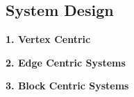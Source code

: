 

\subsection*{System Design}
\textbf{1. Vertex Centric} 




\par
\textbf{2. Edge Centric Systems}




\par
\textbf{3. Block Centric Systems}


